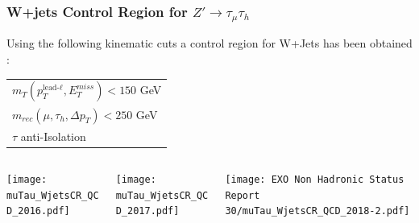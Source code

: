 \documentclass[8pt,xcolor=dvipsnames,xcolor=table]{beamer}
\begin{document}
\begin{frame}
\frametitle{W+jets Control Region for $Z'\rightarrow\tau_\mu\tau_h$}
Using the following kinematic cuts a control region for W+Jets has been obtained :
\begin{center}
\begin{tabular}{l}
\hline
$m_T(p_T^{\text{lead-}\ell},E_T^{miss})<150$ GeV\\
$m_{rec}(\mu,\tau_h,\Delta p_T)<250$ GeV \\
$\tau$ anti-Isolation\\
\hline
\end{tabular}    
\end{center}
\begin{columns}
\begin{column}{.33\textwidth}
\centering
\texttt{[image: muTau\_WjetsCR\_QCD\_2016.pdf]}
\small
{}
\end{column}
\begin{column}{.33\textwidth}
\centering
\texttt{[image: muTau\_WjetsCR\_QCD\_2017.pdf]}
\small
{}
\end{column}
\begin{column}{.33\textwidth}
\centering
\texttt{[image: EXO Non Hadronic Status Report 30/muTau\_WjetsCR\_QCD\_2018-2.pdf]}
\small
{}
\end{column}
\end{columns}
\smallskip
\smallskip
\centering
 \textcolor{blue}{}
\end{frame}
\end{document}
